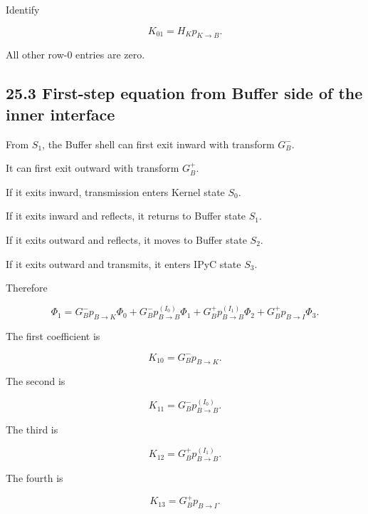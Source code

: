 \documentclass[11pt,a4paper]{article}
\begin{document}
Identify

\begin{equation}
K_{01}
=
H_Kp_{K\rightarrow B}.
\tag{TRISO-MR-014}
\label{eq:triso-mr-014}
\end{equation}

All other row-0 entries are zero.

\subsection*{25.3 First-step equation from Buffer side of the inner interface}

From $S_1$, the Buffer shell can first exit inward with transform $G_B^-$.

It can first exit outward with transform $G_B^+$.

If it exits inward, transmission enters Kernel state $S_0$.

If it exits inward and reflects, it returns to Buffer state $S_1$.

If it exits outward and reflects, it moves to Buffer state $S_2$.

If it exits outward and transmits, it enters IPyC state $S_3$.

Therefore

\begin{equation}
\Phi_1
=
G_B^-p_{B\rightarrow K}\Phi_0
+
G_B^-p_{B\rightarrow B}^{(I_0)}\Phi_1
+
G_B^+p_{B\rightarrow B}^{(I_1)}\Phi_2
+
G_B^+p_{B\rightarrow I}\Phi_3.
\tag{TRISO-MR-015}
\label{eq:triso-mr-015}
\end{equation}

The first coefficient is

\begin{equation}
K_{10}
=
G_B^-p_{B\rightarrow K}.
\tag{TRISO-MR-016}
\label{eq:triso-mr-016}
\end{equation}

The second is

\begin{equation}
K_{11}
=
G_B^-p_{B\rightarrow B}^{(I_0)}.
\tag{TRISO-MR-017}
\label{eq:triso-mr-017}
\end{equation}

The third is

\begin{equation}
K_{12}
=
G_B^+p_{B\rightarrow B}^{(I_1)}.
\tag{TRISO-MR-018}
\label{eq:triso-mr-018}
\end{equation}

The fourth is

\begin{equation}
K_{13}
=
G_B^+p_{B\rightarrow I}.
\tag{TRISO-MR-019}
\label{eq:triso-mr-019}
\end{equation}
\end{document}
